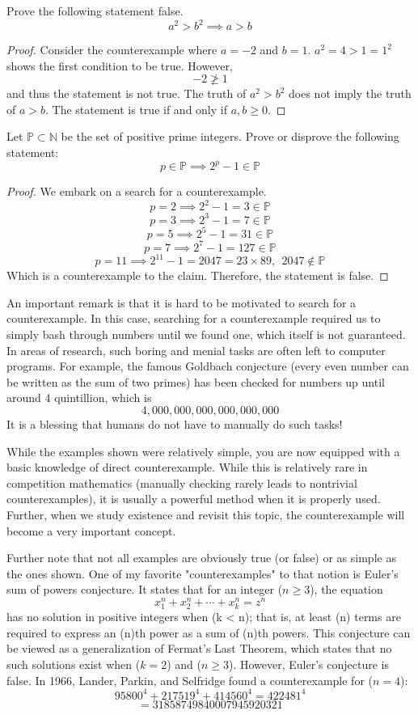 \begin{example}
Prove the following statement false. 
\[
a^2 > b^2 \implies a > b
\]
\end{example}
\begin{proof}
Consider the counterexample where $a = -2$ and $b = 1$. $a^2 = 4 > 1 = 1^2$ shows the first condition to be true. However,
\[
-2 \ngeq 1
\]
and thus the statement is not true. The truth of $a^2 > b^2$ does not imply the truth of $a > b$. The statement is true if and only if $a, b \geq 0$.
\end{proof}

\begin{example}
Let $\mathbb{P}\subset \mathbb{N}$ be the set of positive prime integers. Prove or disprove the following statement:
\[
p \in \mathbb{P} \implies 2^p - 1 \in \mathbb{P}
\]
\end{example}
\begin{proof}
We embark on a search for a counterexample.
\[
p = 2 \implies 2^2 - 1 = 3 \in \mathbb{P}
\]
\[
p = 3 \implies 2^3 - 1 = 7 \in \mathbb{P}
\]
\[
p = 5 \implies 2^5 - 1 = 31 \in \mathbb{P}
\]
\[
p = 7 \implies 2^7 - 1 = 127 \in \mathbb{P}
\]
\[
p = 11 \implies 2^{11} - 1 = 2047=23 \times 89, ~~ 2047 \notin \mathbb{P}
\]
Which is a counterexample to the claim. Therefore, the statement is false.
\end{proof}

An important remark is that it is hard to be motivated to search for a counterexample. In this case, searching for a counterexample required us to simply bash through numbers until we found one, which itself is not guaranteed. In areas of research, such boring and menial tasks are often left to computer programs. For example, the famous Goldbach conjecture (every even number can be written as the sum of two primes) has been checked for numbers up until  around 4 quintillion, which is 
\[
4,000,000,000,000,000,000
\]
It is a blessing that humans do not have to manually do such tasks!

While the examples shown were relatively simple, you are now equipped with a basic knowledge of direct counterexample. While this is relatively rare in competition mathematics (manually checking rarely leads to nontrivial counterexamples), it is usually a powerful method when it is properly used. Further, when we study existence and revisit this topic, the counterexample will become a very important concept. 

Further note that not all examples are obviously true (or false) or as simple as the ones shown. One of my favorite "counterexamples" to that notion is Euler's sum of powers conjecture. It states that for an integer ($n \geq 3$), the equation
\[
x_1^n + x_2^n + \cdots + x_k^n = z^n
\]
\noindent has no solution in positive integers when (k < n); that is, at least (n) terms are required to express an (n)th power as a sum of (n)th powers. This conjecture can be viewed as a generalization of Fermat's Last Theorem, which states that no such solutions exist when ($k = 2$) and ($n \geq 3$). However, Euler’s conjecture is false. In 1966, Lander, Parkin, and Selfridge found a counterexample for ($n = 4$):
\[
95800^4 + 217519^4 + 414560^4 = 422481^4 
\]
\[
= 31858749840007945920321
\]

